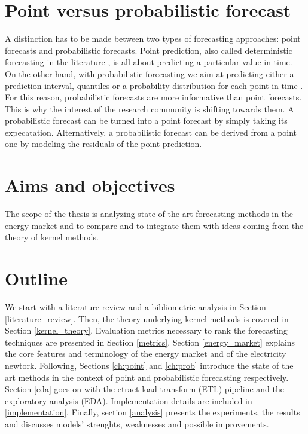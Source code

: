 \section{Point versus probabilistic forecast}
A distinction has to be made between two types of forecasting approaches: point forecasts and probabilistic forecasts.
Point prediction, also called deterministic forecasting in the literature \cite{EPF_review}, is all about predicting a particular value in time.
On the other hand, with probabilistic forecasting we aim at predicting either a prediction interval, quantiles or a probability distribution for each point in time \cite{nowotarski}. For this reason, probabilistic forecasts are more informative than point forecasts. This is why the interest of the research community is shifting towards them.
A probabilistic forecast can be turned into a point forecast by simply taking its expecatation.
Alternatively, a probabilistic forecast can be derived from a point one by modeling the residuals of the point prediction.



\section{Aims and objectives}


The scope of the thesis is analyzing state of the art forecasting methods in the energy market and to compare and to integrate them with ideas coming from the theory of kernel methods.  



\section{Outline}
We start with a literature review and a bibliometric analysis in Section \ref{literature_review}.
Then, the theory underlying kernel methods is covered in Section \ref{kernel_theory}. Evaluation metrics necessary to rank the forecasting techniques are presented in Section \ref{metrics}. Section \ref{energy_market} explains the core features and terminology of the energy market and of the electricity newtork.
Following, Sections \ref{ch:point} and \ref{ch:prob} introduce the state of the art methods in the context of point and probabilistic forecasting respectively.
Section \ref{eda} goes on with the etract-load-transform (ETL) pipeline and the exploratory analysis (EDA). 
Implementation details are included in \ref{implementation}.
Finally, section \ref{analysis} presents the experiments, the results and discusses models' strenghts, weaknesses and possible improvements.
